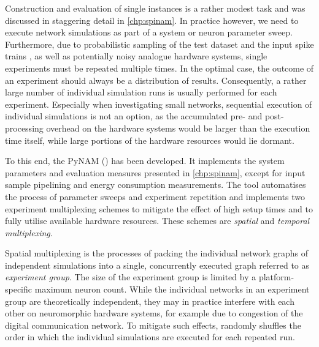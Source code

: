 Construction and evaluation of single \BiNAM instances is a rather modest task and was discussed in staggering detail in \cref{chp:spinam}. In practice however, we need to execute network simulations as part of a system or neuron parameter sweep. Furthermore, due to probabilistic sampling of the test dataset \data and the input spike trains \tIn, as well as potentially noisy analogue hardware systems, single experiments must be repeated multiple times. In the optimal case, the outcome of an experiment should always be a distribution of results. Consequently, a rather large number of individual simulation runs is usually performed for each experiment. Especially when investigating small networks, sequential execution of individual simulations is not an option, as the accumulated pre- and post-processing overhead on the hardware systems would be larger than the execution time itself, while large portions of the hardware resources would lie dormant.

To this end, the \acrlong{PyNAM} (\mbox{\PyNAM}) has been developed. It implements the system parameters and evaluation measures presented in \cref{chp:spinam}, except for input sample pipelining and energy consumption measurements. The tool automatises the process of parameter sweeps and experiment repetition and implements two experiment multiplexing schemes to mitigate the effect of high setup times and to fully utilise available hardware resources. These schemes are \emph{spatial} and \emph{temporal multiplexing}.

Spatial multiplexing is the processes of packing the individual network graphs of independent simulations into a single, concurrently executed graph referred to as \emph{experiment group}. The size of the experiment group is limited by a platform-specific maximum neuron count. While the individual networks in an experiment group are theoretically independent, they may in practice interfere with each other on neuromorphic hardware systems, for example due to congestion of the digital communication network. To mitigate such effects, \PyNAM randomly shuffles the order in which the individual simulations are executed for each repeated run.

